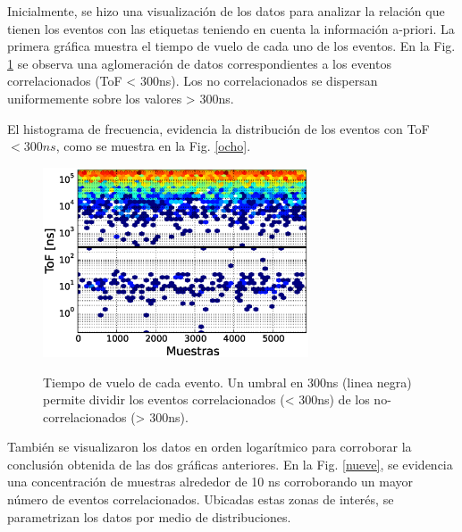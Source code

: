 Inicialmente, se hizo una visualización de los datos para analizar la relación que tienen los eventos con las etiquetas teniendo en cuenta la información a-priori. La primera gráfica muestra el tiempo de vuelo de cada uno de los eventos. En la Fig. \ref{300} se observa una aglomeración de datos correspondientes a los eventos correlacionados (ToF < 300ns). Los no correlacionados se dispersan uniformemente sobre los valores > 300ns.

El histograma de frecuencia, evidencia la distribución de los eventos con ToF $< 300 ns$, como se muestra en la Fig. \ref{ocho}.\\

\begin{figure}[h!]
\begin{center}
\caption{ Tiempo de vuelo de cada evento. Un umbral en 300ns (linea negra) permite dividir los eventos correlacionados (< 300ns) de los no-correlacionados (> 300ns).}
\includegraphics[width=0.7\textwidth]{Figures/imagenes/ag.eps}
\label{300}
\end{center}
\end{figure}


También se visualizaron los datos en orden logarítmico para corroborar la conclusión obtenida de las dos gráficas anteriores. En la Fig. \ref{nueve}, se evidencia una concentración de muestras alrededor de 10 ns corroborando un mayor número de eventos correlacionados. Ubicadas estas zonas de interés, se parametrizan los datos por medio de distribuciones.\\



